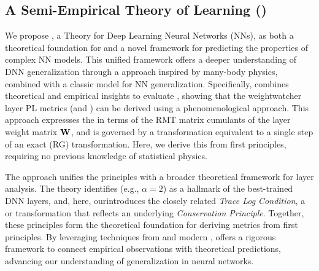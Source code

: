 \subsection{A Semi-Empirical Theory of Learning (\SETOL)}

We propose \SETOL, a \SemiEmpirical Theory for Deep Learning Neural Networks (NNs),
as both a theoretical foundation for \HTSR \Phenomenology
and a novel framework for predicting the properties of complex NN models.
This unified framework offers a deeper understanding of DNN generalization
through a \SemiEmpirical approach inspired by many-body physics,
combined with a classic \STATMECH model for NN generalization.
Specifically, \SETOL combines theoretical and empirical insights to evaluate \ModelQuality,
showing that the weightwatcher layer \HTSR PL metrics (\ALPHA and \ALPHAHAT)
can be derived using a phenomenological \EffectiveHamiltonian approach.
This approach expressses the \HTSR \LayerQuality in terms of the RMT matrix cumulants
of the layer weight matrix ${\mathbf{W}}$,
and is governed by a \ScaleInvariant transformation equivalent
to a single step of an exact \RenormalizationGroup (RG) transformation.
Here, we derive this from first principles, requiring no previous knowledge of statistical physics.

The \SETOL approach unifies the \HTSR principles with
a broader theoretical framework for layer analysis.
The \HTSR theory identifies \Universality (e.g., $\alpha=2$) as a hallmark of the best-trained DNN layers,
and, here, our\SETOL introduces the closely related \emph{Trace Log Condition}, a \ScaleInvariant or
\VolumePreserving transformation that reflects an underlying \emph{Conservation Principle}.
Together, these principles form the theoretical foundation for deriving \HTSR \LayerQuality metrics from first principles.
By leveraging techniques from \STATMECH and modern \RMT, \SETOL offers a rigorous framework
to connect empirical observations with theoretical predictions, advancing our understanding of generalization
in neural networks.

